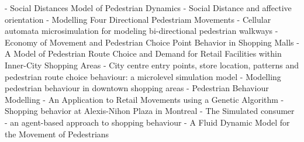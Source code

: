\documentclass[a4paper, 12pt]{article}
\begin{document}

\newpage
    \begin{thebibliography}{9}
        \label{sec:refs}

         - Social Distances Model of Pedestrian Dynamics
         - Social Distance and affective orientation
         - Modelling Four Directional Pedestriam Movements
         - Cellular automata microsimulation for modeling bi-directional pedestrian walkways
         - Economy of Movement and Pedestrian Choice Point Behavior in Shopping Malls
         - A Model of Pedestrian Route Choice and Demand for Retail Facilities within Inner-City Shopping Areas
         - City centre entry points, store location, patterns and pedestrian route choice behaviour: a microlevel simulation model
         - Modelling pedestrian behaviour in downtown shopping areas
         - Pedestrian Behaviour Modelling - An Application to Retail Movements using a Genetic Algorithm
         - Shopping behavior at Alexis-Nihon Plaza in Montreal
         - The Simulated consumer - an agent-based approach to shopping behaviour
         - A Fluid Dynamic Model for the Movement of Pedestrians
    \end{thebibliography}
\end{document}
